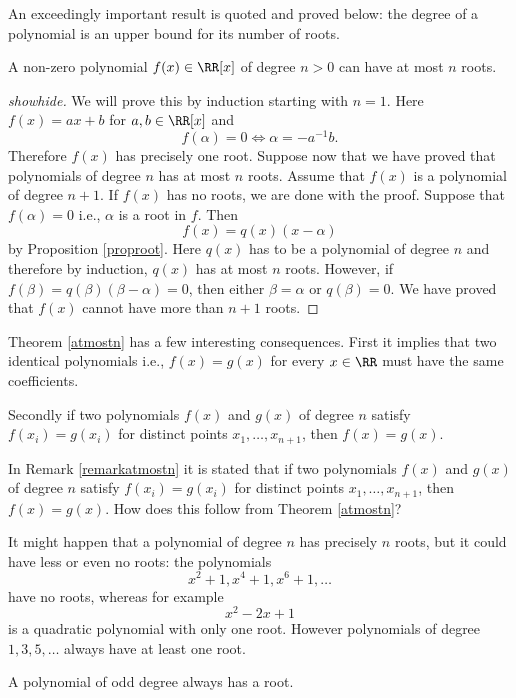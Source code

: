 \documentclass{article}
\begin{document}
  An exceedingly important result is quoted and proved below: the degree of a polynomial is
  an upper bound for its number of roots.

  
\begin{theorem}[emph]\label{atmostn}
  A non-zero polynomial $f(x)\in \RR[x]$ of degree $n > 0$ can have at most $n$ roots.
\end{theorem}
\begin{proof}[showhide]
We will prove this by induction starting with $n = 1$. Here
$f(x) = a x + b$ for $a, b\in \RR[x]$ and
$$
f(\alpha) = 0\iff \alpha = - a^{-1} b.
$$
Therefore $f(x)$ has precisely one root. Suppose now that we have proved that
polynomials of degree $n$ has at most $n$ roots. Assume that 
$f(x)$ is a polynomial of degree $n + 1$. If $f(x)$ has no roots,
we are done with the proof. Suppose that $f(\alpha) = 0$ i.e.,
$\alpha$ is a root in $f$. Then
$$
f(x) = q(x) (x-\alpha)
$$
by Proposition \ref{proproot}. Here $q(x)$ has to be a polynomial of degree $n$ and
therefore by induction, $q(x)$ has at most $n$ roots. However, if $f(\beta) = q(\beta) (\beta - \alpha) = 0$,
then either $\beta = \alpha$ or $q(\beta) = 0$. We have proved that 
$f(x)$ cannot have more than $n+1$ roots.
\end{proof}


\begin{remark}\label{remarkatmostn}
  Theorem \ref{atmostn} has a few interesting consequences. First it implies that two
  identical polynomials i.e., $f(x) = g(x)$ for every $x\in \RR$ must have
  the same coefficients.

  Secondly if two polynomials $f(x)$ and $g(x)$ of degree $n$ satisfy
  $f(x_i) = g(x_i)$ for distinct points $x_1, \dots, x_{n+1}$, then
  $f(x) = g(x)$.
\end{remark}

\beginshex
In Remark \ref{remarkatmostn} it is stated that if two polynomials $f(x)$ and $g(x)$ of degree $n$ satisfy
  $f(x_i) = g(x_i)$ for distinct points $x_1, \dots, x_{n+1}$, then
  $f(x) = g(x)$. How does this follow from Theorem \ref{atmostn}?
\endshex

It might happen that a  polynomial of degree $n$ has precisely $n$ roots, but it could have less or
even no roots: the polynomials
$$
x^2 + 1, x^4 + 1, x^6 + 1, \dots
$$
have no roots, whereas for example
$$
x^2 - 2 x + 1
$$
is a quadratic polynomial with only one root. However polynomials of degree $1, 3, 5, \dots$ always have at 
least one root.

\begin{theorem}[emph]
A polynomial of odd degree always has a root.
\end{theorem}
\end{document}
